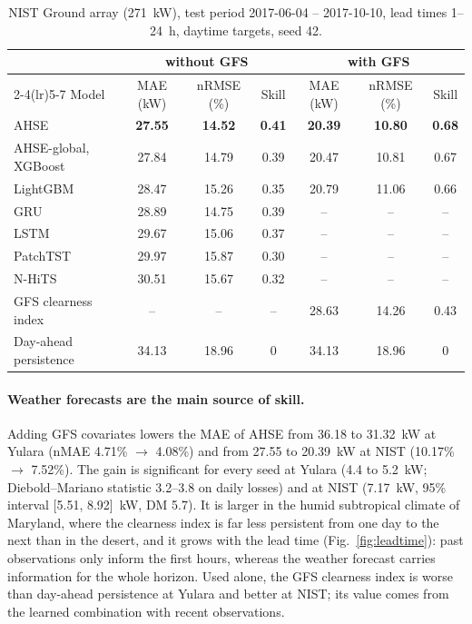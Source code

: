 \begin{table}[t]
  \centering
  \caption{NIST Ground array (271~kW), test period 2017-06-04 -- 2017-10-10, lead times
  1--24~h, daytime targets, seed 42.}
  \label{tab:nist}
  \small
  \begin{tabular}{lcccccc}
    \toprule
    & \multicolumn{3}{c}{without GFS} & \multicolumn{3}{c}{with GFS} \\
    \cmidrule(lr){2-4}\cmidrule(lr){5-7}
    Model & MAE (kW) & nRMSE (\%) & Skill & MAE (kW) & nRMSE (\%) & Skill \\
    \midrule
    AHSE                   & \textbf{27.55} & \textbf{14.52} & \textbf{0.41} & \textbf{20.39} & \textbf{10.80} & \textbf{0.68} \\
    AHSE-global, XGBoost   & 27.84 & 14.79 & 0.39 & 20.47 & 10.81 & 0.67 \\
    LightGBM               & 28.47 & 15.26 & 0.35 & 20.79 & 11.06 & 0.66 \\
    GRU                    & 28.89 & 14.75 & 0.39 & -- & -- & -- \\
    LSTM                   & 29.67 & 15.06 & 0.37 & -- & -- & -- \\
    PatchTST               & 29.97 & 15.87 & 0.30 & -- & -- & -- \\
    N-HiTS                 & 30.51 & 15.67 & 0.32 & -- & -- & -- \\
    GFS clearness index    & -- & -- & -- & 28.63 & 14.26 & 0.43 \\
    Day-ahead persistence  & 34.13 & 18.96 & 0 & 34.13 & 18.96 & 0 \\
    \bottomrule
  \end{tabular}
\end{table}

\paragraph{Weather forecasts are the main source of skill.}
Adding GFS covariates lowers the MAE of AHSE from 36.18 to 31.32~kW at Yulara (nMAE 4.71\%
$\to$ 4.08\%) and from 27.55 to 20.39~kW at NIST (10.17\% $\to$ 7.52\%). The gain is significant
for every seed at Yulara (4.4 to 5.2~kW; Diebold--Mariano statistic 3.2--3.8 on daily losses) and
at NIST (7.17~kW, 95\% interval [5.51, 8.92]~kW, DM 5.7). It is larger in the humid subtropical
climate of Maryland, where the clearness index is far less persistent from one day to the next
than in the desert, and it grows with the lead time (Fig.~\ref{fig:leadtime}): past observations
only inform the first hours, whereas the weather forecast carries information for the whole
horizon. Used alone, the GFS clearness index is worse than day-ahead persistence at Yulara and
better at NIST; its value comes from the learned combination with recent observations.

